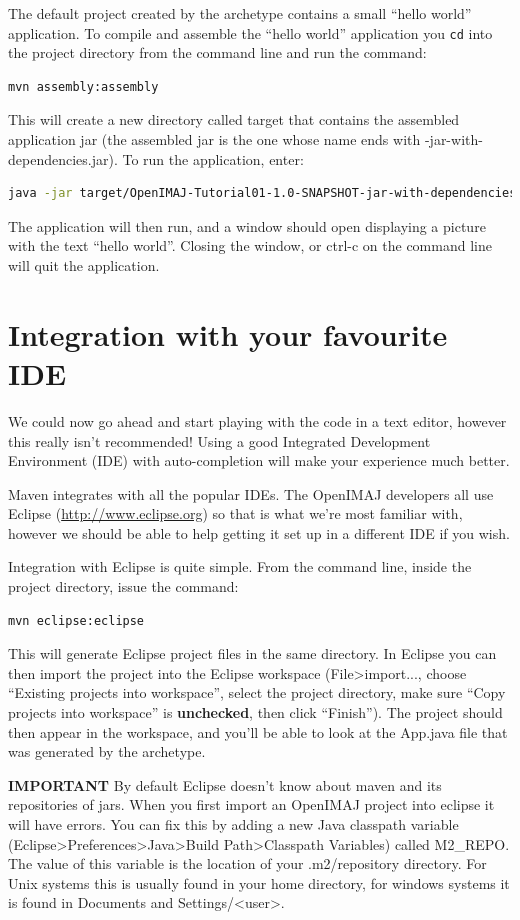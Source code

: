 \documentclass[10pt,a4paper,twoside,extrafontsizes]{memoir}
\begin{document}
The default project created by the archetype contains a small ``hello world'' application. To 
compile and assemble the ``hello world'' application you \verb+cd+ into the project directory 
from the command line and run the command:
\begin{lstlisting}[language=bash]
mvn assembly:assembly
\end{lstlisting}
This will create a new directory called target that contains the assembled application jar 
(the assembled jar is the one whose name ends with -jar-with-dependencies.jar). To run the 
application, enter:
\begin{lstlisting}[language=bash]
java -jar target/OpenIMAJ-Tutorial01-1.0-SNAPSHOT-jar-with-dependencies.jar
\end{lstlisting}
The application will then run, and a window should open displaying a picture with the text 
``hello world''. Closing the window, or ctrl-c on the command line will quit the application.

\section*{Integration with your favourite IDE}
We could now go ahead and start playing with the code in a text editor, however this really 
isn't recommended! Using a good Integrated Development Environment (IDE) with auto-completion will 
make your experience much better.

Maven integrates with all the popular IDEs. The OpenIMAJ developers all use Eclipse 
(\url{http://www.eclipse.org}) so that is what we're most familiar with, however we should be able 
to help getting it set up in a different IDE if you wish. 

Integration with Eclipse is quite simple. From the command line, inside the project directory, 
issue the command:
\begin{lstlisting}[language=bash]
mvn eclipse:eclipse
\end{lstlisting}
This will generate Eclipse project files in the same directory. In Eclipse you can then import 
the project into the Eclipse workspace (File>import..., choose ``Existing projects into workspace'', 
select the project directory, make sure ``Copy projects into workspace'' is \textbf{unchecked}, then click
 ``Finish''). The project should then appear in the workspace, and you'll be able to look at the 
App.java file that was generated by the archetype.

\textbf{IMPORTANT} By default Eclipse doesn't know about maven and its repositories of jars. When you 
first import an OpenIMAJ project into eclipse it will have errors. You can fix this by adding 
a new Java classpath variable (Eclipse>Preferences>Java>Build Path>Classpath Variables) 
called M2\_REPO. The value of this variable is the location of your .m2/repository directory. 
For Unix systems this is usually found in your home directory, for windows systems it is found 
in Documents and Settings/<user>.
\end{document}
